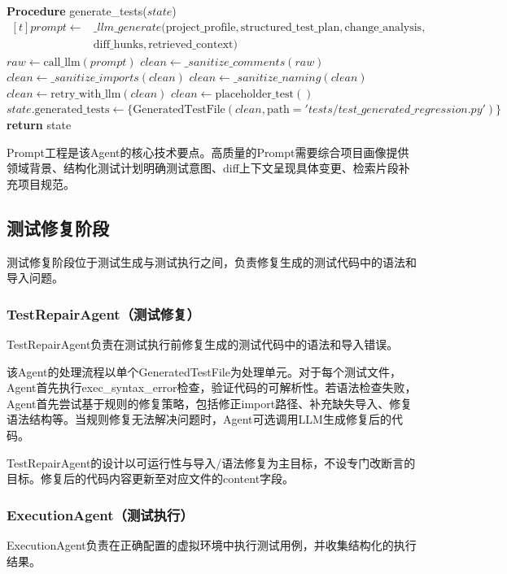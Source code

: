 \begin{algorithm}[htbp]
\caption{TestGenAgent测试生成流程（抽象示意）}
\label{alg:test-gen}
\begin{algorithmic}[1]
\STATE \textbf{Procedure} generate\_tests($state$)
\STATE $\begin{aligned}[t]
            prompt \leftarrow {} & \_llm\_generate(\text{project\_profile}, \text{structured\_test\_plan}, \text{change\_analysis}, \\
            & \text{diff\_hunks}, \text{retrieved\_context})
        \end{aligned}$
\STATE $raw \leftarrow \text{call\_llm}(prompt)$
\STATE $clean \leftarrow \_sanitize\_comments(raw)$
\STATE $clean \leftarrow \_sanitize\_imports(clean)$
\STATE $clean \leftarrow \_sanitize\_naming(clean)$
\STATE $clean \leftarrow \text{retry\_with\_llm}(clean)$
\STATE $clean \leftarrow \text{placeholder\_test}()$
\ENDIF
\ENDIF
\STATE $state.\text{generated\_tests} \leftarrow \{\text{GeneratedTestFile}(clean, \text{path}='tests/test\_generated\_regression.py')\}$
\STATE \textbf{return} state
\end{algorithmic}
\end{algorithm}

Prompt工程是该Agent的核心技术要点。高质量的Prompt需要综合项目画像提供领域背景、结构化测试计划明确测试意图、diff上下文呈现具体变更、检索片段补充项目规范。
\subsection{测试修复阶段}
测试修复阶段位于测试生成与测试执行之间，负责修复生成的测试代码中的语法和导入问题。
\subsubsection{TestRepairAgent（测试修复）}
TestRepairAgent负责在测试执行前修复生成的测试代码中的语法和导入错误。

该Agent的处理流程以单个GeneratedTestFile为处理单元。对于每个测试文件，Agent首先执行exec\_syntax\_error检查，验证代码的可解析性。若语法检查失败，Agent首先尝试基于规则的修复策略，包括修正import路径、补充缺失导入、修复语法结构等。当规则修复无法解决问题时，Agent可选调用LLM生成修复后的代码。

TestRepairAgent的设计以可运行性与导入/语法修复为主目标，不设专门改断言的目标。修复后的代码内容更新至对应文件的content字段。
\subsubsection{ExecutionAgent（测试执行）}
ExecutionAgent负责在正确配置的虚拟环境中执行测试用例，并收集结构化的执行结果。

